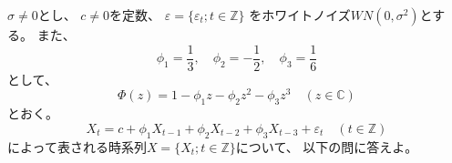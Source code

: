 \documentclass[12pt,b5paper]{ltjsarticle}
\begin{document}
\hrulefill

$\sigma\ne 0$とし、
$c\ne 0$を定数、
$\varepsilon =\{ \varepsilon_{t} ; t\in\mathbb{Z} \}$
をホワイトノイズ$WN(0,\sigma^2)$とする。
また、
\begin{equation}
 \phi_1 =\frac{1}{3},\quad
 \phi_2 =-\frac{1}{2},\quad
 \phi_3 =\frac{1}{6}
\end{equation}
として、
\begin{equation}
 \Phi (z) = 1-\phi_1 z -\phi_2 z^2 - \phi_3 z^3
  \quad (z\in\mathbb{C})
\end{equation}
とおく。
\begin{equation}
 X_t=c+\phi_1X_{t-1} + \phi_2X_{t-2} + \phi_3X_{t-3} + \varepsilon_t
  \quad (t\in\mathbb{Z})
  \label{Xt}
\end{equation}
によって表される時系列$X=\{X_t;t\in\mathbb{Z}\}$について、
以下の問に答えよ。

\hrulefill
\end{document}
